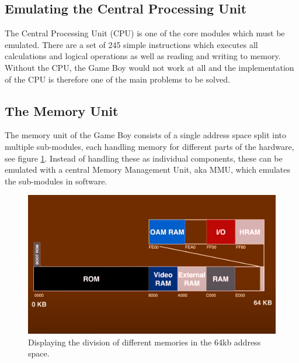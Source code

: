 \subsection{Emulating the Central Processing Unit}
The Central Processing Unit (CPU) is one of the core modules which must be emulated. There are a set of 245 simple instructions\cite{Optable} which executes all calculations and logical operations as well as reading and writing to memory. Without the CPU, the Game Boy would not work at all and the implementation of the CPU is therefore one of the main problems to be solved.%


\subsection{The Memory Unit}
The memory unit of the Game Boy consists of a single address space split into multiple sub-modules, each handling memory for different parts of the hardware, see figure \ref{fig:Memory-fig}. Instead of handling these as individual components, these can be emulated with a central Memory Management Unit, aka  MMU, which emulates the sub-modules in software.

  \begin{figure}[H]
    \centering
    \includegraphics[width=\textwidth]{figures/Memory.png}
    \caption{Displaying the division of different memories in the 64kb address space. \cite{GBTMem}}
    \label{fig:Memory-fig}
\end{figure}  

    
